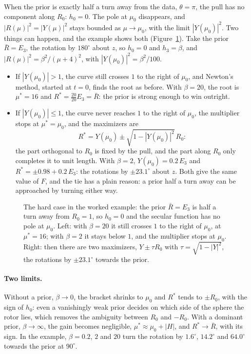 \documentclass{birkjour}
\theoremstyle{definition}
\theoremstyle{remark}
\numberwithin{equation}{section}
\begin{document}
When the prior is exactly half a turn away from the data, $\theta = \pi$, the pull has no component along $R_0$: $h_0 = 0$. The pole at $\mu_0$ disappears, and $|R(\mu)|^2 = |Y(\mu)|^2$ stays bounded as $\mu \to \mu_0$, with the limit $|Y(\mu_0)|^2$. Two things can happen, and the example shows both (Figure~\ref{fig:prior_hard}). Take the prior $\bar R = E_3$, the rotation by $180^\circ$ about $z$, so $h_0 = 0$ and $h_3 = \beta$, and $|R(\mu)|^2 = \beta^2 / (\mu + 4)^2$, with $|Y(\mu_0)|^2 = \beta^2 / 100$.
\begin{itemize}
\item If $|Y(\mu_0)| > 1$, the curve still crosses $1$ to the right of $\mu_0$, and Newton's method, started at $t = 0$, finds the root as before. With $\beta = 20$, the root is $\mu^* = 16$ and $R^* = \frac{20}{20} E_3 = \bar R$: the prior is strong enough to win outright.
\item If $|Y(\mu_0)| \leq 1$, the curve never reaches $1$ to the right of $\mu_0$, the multiplier stops at $\mu^* = \mu_0$, and the maximizers are
\begin{equation}
\label{eqn:prior_hard}
R^* = Y(\mu_0) \pm \sqrt{1 - |Y(\mu_0)|^2}\, R_0 :
\end{equation}
the part orthogonal to $R_0$ is fixed by the pull, and the part along $R_0$ only completes it to unit length. With $\beta = 2$, $Y(\mu_0) = 0.2\, E_3$ and $R^* = \pm 0.98 + 0.2\, E_3$: the rotations by $\pm 23.1^\circ$ about $z$. Both give the same value of $F$, and the tie has a plain reason: a prior half a turn away can be approached by turning either way.
\end{itemize}

\begin{figure}[t]
\centering
{}
\caption{The hard case in the worked example: the prior $\bar R = E_3$ is half a turn away from $R_0 = 1$, so $h_0 = 0$ and the secular function has no pole at $\mu_0$. Left: with $\beta = 20$ it still crosses $1$ to the right of $\mu_0$, at $\mu^* = 16$; with $\beta = 2$ it stays below $1$, and the multiplier stops at $\mu_0$. Right: then there are two maximizers, $Y \pm \tau R_0$ with $\tau = \sqrt{1 - |Y|^2}$, the rotations by $\pm 23.1^\circ$ towards the prior.}
\label{fig:prior_hard}
\end{figure}

\paragraph{Two limits.} Without a prior, $\beta \to 0$, the bracket shrinks to $\mu_0$ and $R^*$ tends to $\pm R_0$, with the sign of $h_0$: even a vanishingly weak prior decides on which side of the sphere the rotor lies, which removes the ambiguity between $R_0$ and $-R_0$. With a dominant prior, $\beta \to \infty$, the gain becomes negligible, $\mu^* \approx \mu_0 + |H|$, and $R^* \to \bar R$, with its sign. In the example, $\beta = 0.2$, $2$ and $20$ turn the rotation by $1.6^\circ$, $14.2^\circ$ and $64.0^\circ$ towards the prior at $90^\circ$.
\end{document}
